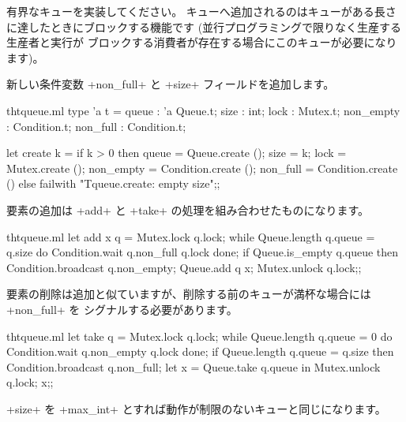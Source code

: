\begin{exercise}
有界なキューを実装してください。
キューへ追加されるのはキューがある長さに達したときにブロックする機能です
(並行プログラミングで限りなく生産する生産者と実行が
ブロックする消費者が存在する場合にこのキューが必要になります)。
\end{exercise}
\begin{answer}
新しい条件変数 \ml+non_full+ と \ml+size+ フィールドを追加します。
%
\begin{listingcodefile}{thtqueue.ml}
type 'a t =
    { queue : 'a Queue.t; size : int; lock : Mutex.t;
      non_empty : Condition.t; non_full : Condition.t; }

let create k =
  if  k > 0 then
    { queue = Queue.create (); size = k; lock = Mutex.create ();
      non_empty = Condition.create (); non_full = Condition.create () }
  else failwith "Tqueue.create: empty size";;
\end{listingcodefile}
%
要素の追加は \ml+add+ と \ml+take+ の処理を組み合わせたものになります。
%
\begin{listingcodefile}{thtqueue.ml}
let add x q =
  Mutex.lock q.lock;
  while Queue.length q.queue = q.size
  do Condition.wait q.non_full q.lock done;
  if Queue.is_empty q.queue then Condition.broadcast q.non_empty;
  Queue.add q x;
  Mutex.unlock q.lock;;
\end{listingcodefile}
%
要素の削除は追加と似ていますが、削除する前のキューが満杯な場合には \ml+non_full+ を
シグナルする必要があります。
%
\begin{codefile}{thtqueue.ml}
let take q =
  Mutex.lock q.lock;
  while Queue.length q.queue = 0
  do Condition.wait q.non_empty q.lock done;
  if Queue.length q.queue = q.size then Condition.broadcast q.non_full;
  let x = Queue.take q.queue in
  Mutex.unlock q.lock; x;;
\end{codefile}
%
\ml+size+ を \ml+max_int+ とすれば動作が制限のないキューと同じになります。
\end{answer}



